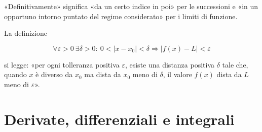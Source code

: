 «Definitivamente» significa «da un certo indice in poi» per le successioni e «in un opportuno intorno puntato del regime considerato» per i limiti di funzione.

La definizione

\[
\forall\varepsilon>0\ \exists\delta>0:\
0<|x-x_0|<\delta
\Rightarrow
|f(x)-L|<\varepsilon
\]

si legge: «per ogni tolleranza positiva \(\varepsilon\), esiste una distanza positiva \(\delta\) tale che, quando \(x\) è diverso da \(x_0\) ma dista da \(x_0\) meno di \(\delta\), il valore \(f(x)\) dista da \(L\) meno di \(\varepsilon\)».

\section{Derivate, differenziali e integrali}\label{derivate-differenziali-e-integrali}

